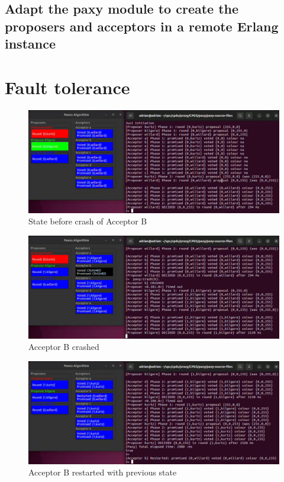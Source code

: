\documentclass[a4paper, 10pt]{article}
\begin{document}
\subsection{Adapt the paxy module to create the proposers and acceptors in a remote Erlang instance}



\section{Fault tolerance}


\begin{figure}[H]
  \centering
  \includegraphics[width=\linewidth]{images/Tolerance1.png}
    \caption{State before crash of Acceptor B}
\end{figure} 


\begin{figure}[H]
  \centering
  \includegraphics[width=\linewidth]{images/Tolerance2.png}
    \caption{Acceptor B crashed}
\end{figure} 

\begin{figure}[H]
  \centering
  \includegraphics[width=\linewidth]{images/Tolerance3.png}
    \caption{Acceptor B restarted with previous state}
\end{figure}
\end{document}
